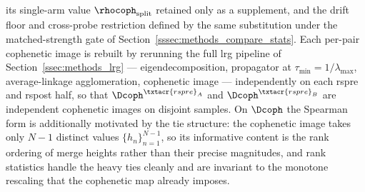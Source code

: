 its single-arm value \(\rhocoph_{\mathrm{split}}\) retained only as a supplement, and the drift floor and cross-probe restriction defined by the same substitution under the matched-strength gate of Section~\ref{sssec:methods_compare_stats}. Each per-pair cophenetic image is rebuilt by rerunning the full \gls{lrg} pipeline of Section~\ref{ssec:methods_lrg} --- eigendecomposition, propagator at \(\tau_{\min} = 1/\lambda_{\max}\), average-linkage agglomeration, cophenetic image --- independently on each \acrshort{rspre} and \acrshort{rspost} half, so that \(\Dcoph^{\txtacr{rspre}_{A}}\) and \(\Dcoph^{\txtacr{rspre}_{B}}\) are independent cophenetic images on disjoint samples. On \(\Dcoph\) the Spearman form is additionally motivated by the tie structure: the cophenetic image takes only \(N-1\) distinct values \(\{h_{n}\}_{n=1}^{N-1}\), so its informative content is the rank ordering of merge heights rather than their precise magnitudes, and rank statistics handle the heavy ties cleanly and are invariant to the monotone rescaling that the cophenetic map already imposes.



